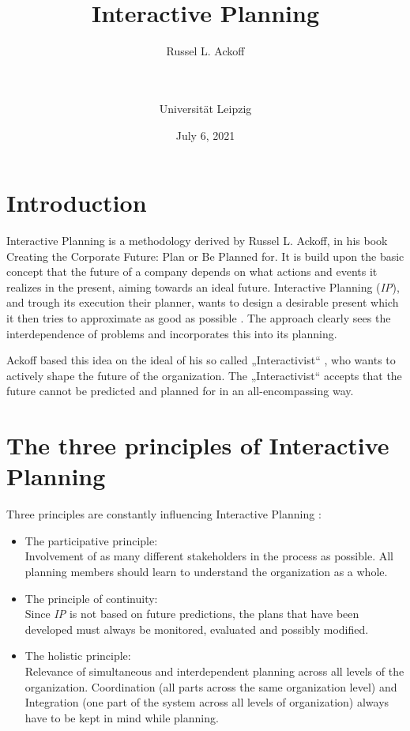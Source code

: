\documentclass[
a4paper,
12pt
]{scrartcl}
\title{Interactive Planning}
\subtitle{Russel L. Ackoff}
\author{\\\vspace{-0.4em}{\normalsize Daniel Werner} \\ {\normalsize Universität Leipzig}}
\date{{\normalsize July 6, 2021}}
\begin{document}
	\maketitle
	\section{Introduction}
	
	Interactive Planning is a methodology derived by Russel L. Ackoff, in his  book \glqq Creating the Corporate Future: Plan or Be Planned for\grqq  \cite{ackoff:2001}. It is build upon the basic concept that the future of a company depends on what actions and events it realizes in the present, aiming towards an ideal  future. Interactive Planning (\textit{IP}), and trough its execution their planner, wants to design a desirable present which it then tries to approximate as good as possible \cite{ackoff:2001}. The approach clearly sees the interdependence of problems and incorporates this into its planning.
	
	Ackoff based this idea on the ideal of his so called „Interactivist“ , who wants to actively shape the future of the organization. The „Interactivist“ accepts that the future cannot be predicted  and planned for in an all-encompassing way.    
   
   \section{The three principles of Interactive Planning}
     Three principles are constantly influencing Interactive Planning \cite{giannaris:2011}:
     \begin{itemize}
     	\item The participative principle: \\Involvement of as many different stakeholders in the process as possible. All planning members should learn to understand the organization as a whole.
     	
     	\item The principle of continuity:\\Since \textit{IP} is not based on future predictions, the plans that have been developed must always be monitored, evaluated and possibly modified.
     	
     	\item The holistic principle:\\Relevance of simultaneous and interdependent planning across all levels of the organization. Coordination (all parts across the same organization level) and Integration (one part of the system across all levels of organization) always have to be kept in mind while planning.
     \end{itemize}
     
\end{document}
